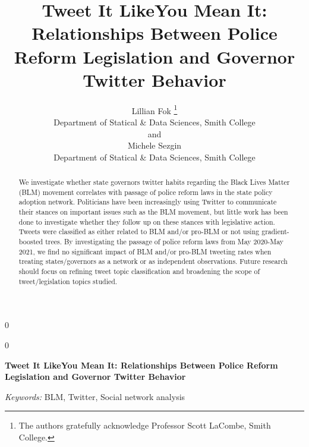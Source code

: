 \documentclass[12pt]{article}
\newcommand{\blind}{0}
\begin{document}
\def\spacingset#1{\renewcommand{\baselinestretch}%
{#1}\small\normalsize} \spacingset{1}



\blind
{
  \title{\bf Tweet It LikeYou Mean It: Relationships Between Police
Reform Legislation and Governor Twitter Behavior}

  \author{
        Lillian Fok \thanks{The authors gratefully acknowledge Professor
Scott LaCombe, Smith College.} \\
    Department of Statical \& Data Sciences, Smith College\\
     and \\     Michele Sezgin \\
    Department of Statical \& Data Sciences, Smith College\\
      }
  \maketitle
} \fi

\blind
{
  \bigskip
  \bigskip
  \bigskip
  \begin{center}
    {\LARGE\bf Tweet It LikeYou Mean It: Relationships Between Police
Reform Legislation and Governor Twitter Behavior}
  \end{center}
  \medskip
} \fi

\bigskip
\begin{abstract}
We investigate whether state governors twitter habits regarding the
Black Lives Matter (BLM) movement correlates with passage of police
reform laws in the state policy adoption network. Politicians have been
increasingly using Twitter to communicate their stances on important
issues such as the BLM movement, but little work has been done to
investigate whether they follow up on these stances with legislative
action. Tweets were classified as either related to BLM and/or pro-BLM
or not using gradient-boosted trees. By investigating the passage of
police reform laws from May 2020-May 2021, we find no significant impact
of BLM and/or pro-BLM tweeting rates when treating states/governors as a
network or as independent observations. Future research should focus on
refining tweet topic classification and broadening the scope of
tweet/legislation topics studied.
\end{abstract}

\noindent%
{\it Keywords:} BLM, Twitter, Social network analysis
\vfill
\end{document}

